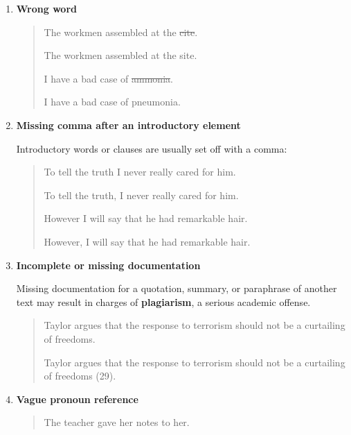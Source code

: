 \begin{enumerate}

\item \textbf{Wrong word}

\begin{quote}
The workmen assembled at the \sout{cite}. 

The workmen assembled at the site. 

\medskip

I have a bad case of \sout{ammonia}. 

I have a bad case of pneumonia. 
\end{quote}

\item \textbf{Missing comma after an introductory element}

Introductory words or clauses are usually set off with a comma:

\begin{quote}

To tell the truth I never really cared for him. 

To tell the truth, I never really cared for him. 

\medskip

However I will say that he had remarkable hair. 

However, I will say that he had remarkable hair. 
\end{quote}

\item \textbf{Incomplete or missing documentation}

Missing documentation for a quotation, summary, or paraphrase of another text
may result in charges of \textbf{plagiarism}, a serious academic offense.

\begin{quote}
Taylor argues that the response to terrorism should not be a curtailing of
freedoms. 

\medskip

Taylor argues that the response to terrorism should not be a curtailing of
freedoms (29). 

\end{quote}

\item \textbf{Vague pronoun reference}

\begin{quote}
The teacher gave her notes to her. 


\end{quote}
\end{enumerate}
